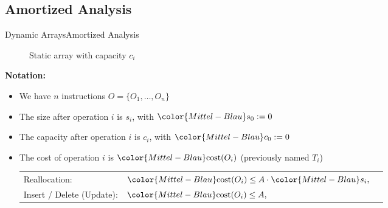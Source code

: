 \subsection{Amortized Analysis}

\begin{frame}{Dynamic Arrays}{Amortized Analysis}
  \vspace*{-1.0em}
  \begin{figure}[!t]%
    \def\FSAsize{16}\def\FSAelements{11}%
    \def\FSAcopy{0}\def\FSAdelete{0}\def\FSAinsert{0}%
    \def \FSAcopyarrow{1}%
    \def\FSAlabelsize{Size ${\color{Mittel-Blau}s_i}$}%
    \def\FSAlabelcapacity{Capacity ${\color{Mittel-Blau}c_i}$}%
    \vspace*{-0.5em}%
    \caption{Static array with capacity $c_i$}%
    \label{fig:array_amortized analysis}%
  \end{figure}%
  \vspace*{-1.0em}
  \textbf{Notation:}%
  \begin{itemize}%
    \item
      We have $n$ instructions $O = \{O_1,\dots,O_n\}$
    \item
      The {\color{Mittel-Blau}size} after operation $i$ is
      {\color{Mittel-Blau}$s_i$},
      with ${\color{Mittel-Blau}s_0} := 0$
    \item
      The {\color{Mittel-Blau}capacity} after operation $i$ is
      {\color{Mittel-Blau}$c_i$},
      with ${\color{Mittel-Blau}c_0} := 0$
    \item
      The {\color{Mittel-Blau}cost} of operation $i$ is
      ${\color{Mittel-Blau}\mathrm{cost}(O_i)}$
      (previously named $T_i$)\\[0.5em]
      \begin{tabular}{lll}
        Reallocation: &
        ${\color{Mittel-Blau}\mathrm{cost}(O_i)}
          \leq A \cdot {\color{Mittel-Blau}s_i},$ & {}\\
        Insert / Delete (Update): &
        ${\color{Mittel-Blau}\mathrm{cost}(O_i)}
          \leq A,$ & {}
      \end{tabular}
  \end{itemize}
\end{frame}


